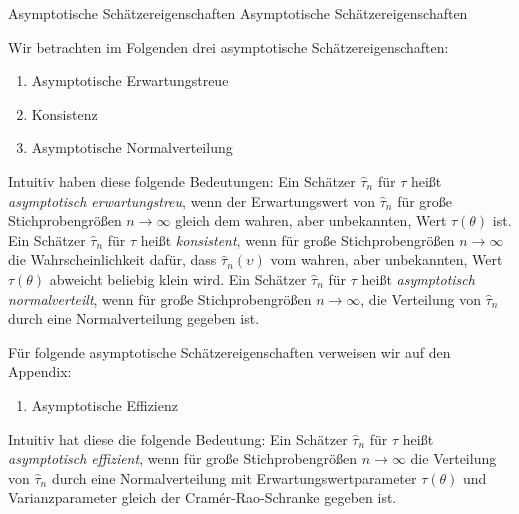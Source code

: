 \documentclass[
  8pt,
  ignorenonframetext,
]{beamer}
\providecommand{\tightlist}{%
  \setlength{\itemsep}{0pt}\setlength{\parskip}{0pt}}
\newcommand{\ups} {\upsilon}
\begin{document}
\begin{frame}{Asymptotische Schätzereigenschaften}
\protect\hypertarget{asymptotische-schuxe4tzereigenschaften-1}{}
Asymptotische Schätzereigenschaften

\footnotesize

Wir betrachten im Folgenden drei asymptotische Schätzereigenschaften:

\begin{enumerate}
[(1)]
\tightlist
\item
  Asymptotische Erwartungstreue
\item
  Konsistenz
\item
  Asymptotische Normalverteilung
\end{enumerate}

Intuitiv haben diese folgende Bedeutungen: Ein Schätzer \(\hat{\tau}_n\)
für \(\tau\) heißt \emph{asymptotisch erwartungstreu}, wenn der
Erwartungswert von \(\hat{\tau}_n\) für große Stichprobengrößen
\(n \to \infty\) gleich dem wahren, aber unbekannten, Wert
\(\tau(\theta)\) ist. Ein Schätzer \(\hat{\tau}_n\) für \(\tau\) heißt
\emph{konsistent}, wenn für große Stichprobengrößen \(n \to \infty\) die
Wahrscheinlichkeit dafür, dass \(\hat{\tau}_n(\ups)\) vom wahren, aber
unbekannten, Wert \(\tau(\theta)\) abweicht beliebig klein wird. Ein
Schätzer \(\hat{\tau}_n\) für \(\tau\) heißt \emph{asymptotisch
normalverteilt}, wenn für große Stichprobengrößen \(n \to \infty\), die
Verteilung von \(\hat{\tau}_n\) durch eine Normalverteilung gegeben ist.

Für folgende asymptotische Schätzereigenschaften verweisen wir auf den
Appendix:

\begin{enumerate}
[(1)]
\tightlist
\item
  Asymptotische Effizienz
\end{enumerate}

Intuitiv hat diese die folgende Bedeutung: Ein Schätzer \(\hat{\tau}_n\)
für \(\tau\) heißt \emph{asymptotisch effizient}, wenn für große
Stichprobengrößen \(n \to \infty\) die Verteilung von \(\hat{\tau}_n\)
durch eine Normalverteilung mit Erwartungswertparameter \(\tau(\theta)\)
und Varianzparameter gleich der Cramér-Rao-Schranke gegeben ist.
\end{frame}
\end{document}
